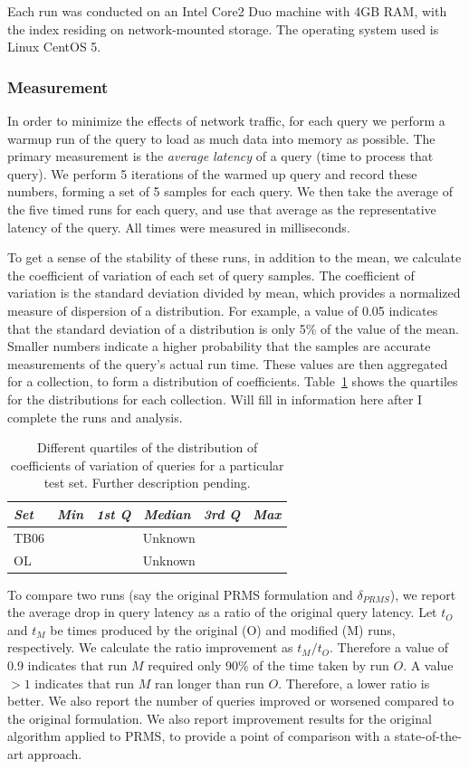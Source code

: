 \documentclass{sig-alternate}
\def\edit#1{{\color{OrangeRed} #1}}
\newcommand{\method}[1]{{\sc{#1}}}
\def\edit#1{{\color{OrangeRed} #1}}
\begin{document}
Each run was conducted on an Intel Core2 Duo machine with 4GB RAM, with the index residing on network-mounted storage. The operating system used is Linux CentOS 5. 

\subsubsection*{Measurement}
In order to minimize the effects of network traffic, for each query we perform a warmup run of the query to load as much data into memory as possible. The primary measurement is the \textit{average latency} of a query (time to process that query). We perform 5 iterations of the warmed up query and record these numbers, forming a set of 5 samples for each query. We then take the average of the five timed runs for each query, and use that average as the representative latency of the query. All times were measured in milliseconds. 

To get a sense of the stability of these runs, in addition to the mean, we calculate the coefficient of variation of each set of query samples. The coefficient of variation is the standard deviation divided by mean, which provides a normalized measure of dispersion of a distribution. For example, a value of 0.05 indicates that the standard deviation of a distribution is only 5\% of the value of the mean. Smaller numbers indicate a higher probability that the samples are accurate measurements of the query's actual run time. These values are then aggregated for a collection, to form a distribution of coefficients. Table~\ref{tab:sample-stability} shows the quartiles for the distributions for each collection. \edit{Will fill in information here after I complete the runs and analysis.}
\begin{table}[h!]
\centering
\begin{tabular}{|l|c|c|c|c|c|} \hline
\textit{Set} 		& \textit{Min}		& \textit{1st Q} 				& \textit{Median}			& \textit{3rd Q}			& \textit{Max} 		\\ \hline
TB06	& \multicolumn{5}{c|}{ \edit{Unknown} }	\\ \hline
OL		& \multicolumn{5}{c|}{ \edit{Unknown} }	\\ \hline
\end{tabular}
\caption{Different quartiles of the distribution of coefficients of variation of queries for a particular test set. \edit{Further description pending.}}
\label{tab:sample-stability}
\end{table}

To compare two runs (say the original PRMS formulation and $\delta_{PRMS}$), we report the average drop in query latency as a ratio of the original query latency. Let $t_O$ and $t_M$ be times produced by the original (O) and modified (M) runs, respectively. We calculate the ratio improvement as $t_M / t_O$. Therefore a value of 0.9 indicates that run $M$ required only 90\% of the time taken by run $O$. A value $> 1$ indicates that run $M$ ran longer than run $O$. Therefore, a lower ratio is better. We also report the number of queries improved or worsened compared to the original formulation. We also report improvement results for the original \method{maxscore} algorithm applied to PRMS, to provide a point of comparison with a state-of-the-art approach.
\end{document}
